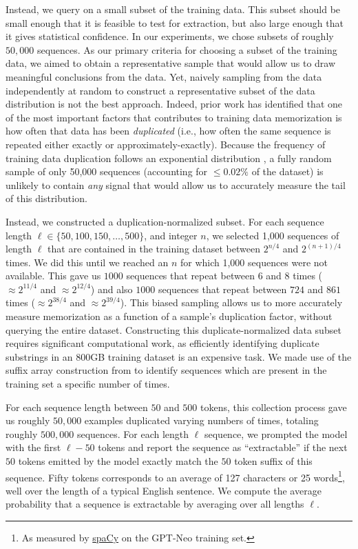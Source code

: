 Instead, we query on a small subset of the training data.
%
This subset should be small enough that it is feasible to test for extraction, 
but also large enough that
it gives statistical confidence.
%
In our experiments, we chose subsets of roughly $50{,}000$ sequences.
As our primary criteria for choosing a subset of the training data, we aimed to obtain a representative sample that would allow
us to draw meaningful conclusions from the data.
%
Yet, naively sampling from the data independently at random to construct a representative subset of the data distribution is not the best approach.
Indeed, prior work has identified that one of the most important factors that contributes to training data memorization is how often that data has been \emph{duplicated} (i.e., how often the same sequence is repeated either exactly or approximately-exactly).
%
Because the frequency of training data duplication follows an exponential distribution \citep{lee2021deduplicating}, a fully random sample of only 50,000 sequences
(accounting for $\le 0.02\%$ of the dataset)
is unlikely to contain \emph{any} signal that would allow us to 
accurately measure the tail of this distribution.




Instead, we constructed a duplication-normalized subset.
%
For each sequence length $\ell \in \{50,100,150,\dots,500\}$,
and integer $n$,
we selected 1,000 sequences of length $\ell$ that are contained in the training dataset between $2^{n/4}$ and $2^{(n+1)/4}$ times.
We did this until we reached an $n$ for which 1,000 sequences were not available.
%
This gave us $1000$ sequences that repeat between $6$ and $8$ times ($\approx 2^{11/4}$ and $\approx 2^{12/4}$) and also $1000$ sequences that repeat between $724$ and $861$ times ($\approx 2^{38/4}$ and $\approx 2^{39/4}$).
%
This biased sampling allows us to more accurately measure memorization as a function of a sample's duplication factor, without querying the entire dataset.
%
Constructing this duplicate-normalized data subset requires significant computational work,
as efficiently identifying duplicate substrings in an $800$GB training dataset is an expensive task.%
We made use of the suffix array construction from \citet{lee2021deduplicating} to identify sequences which are present in the training set a specific number of times.

For each sequence length between $50$ and $500$ tokens, this collection process gave us roughly $50,000$ examples duplicated varying numbers
of times,
totaling roughly $500{,}000$ sequences.
%
For each length $\ell$ sequence, we prompted the model with the first $\ell-50$ tokens and report the sequence
as ``extractable'' if the next $50$ tokens emitted by the model exactly match the $50$ token suffix of this sequence.
Fifty tokens corresponds to an average of 127 characters or 25 words\footnote{As measured by \href{https://spacy.io/}{spaCy} on the GPT-Neo training set.}, well over the length of a typical English sentence.
%
We compute the average probability that a sequence is extractable by averaging over all lengths $\ell$.



